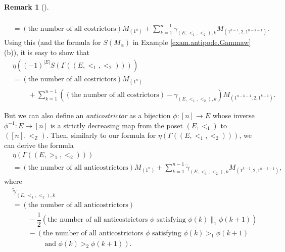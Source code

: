 \documentclass[numbers=enddot,12pt,final,onecolumn,notitlepage,abstracton]{scrartcl}
\theoremstyle{definition}
\newtheorem{remk}[theo]{Remark}
\newenvironment{remark}[1][]
{\begin{remk}[#1]\begin{leftbar}}
{\end{leftbar}\end{remk}}
\let\sumnonlimits\sum
\renewcommand{\sum}{\sumnonlimits\limits}
\newenvironment{verlong}{}{}
\begin{document}
\begin{remark}
\begin{verlong}
\begin{align*}
\\
& =\left(  \text{the number of all costrictors}\right)  M_{\left(
1^{n}\right)  }+\sum_{k=1}^{n-1}\gamma_{\left(  E,<_{1},<_{2}\right)
,k}M_{\left(  1^{k-1},2,1^{n-k-1}\right)  }.
\end{align*}
Using this (and the formula for $S\left(  M_{\alpha}\right)  $ in Example
\ref{exam.antipode.Gammaw} (b)), it is easy to show that
\begin{align*}
& \eta\left(  \left(  -1\right)  ^{\left\vert E\right\vert }S\left(
\Gamma\left(  \left(  E,<_{1},<_{2}\right)  \right)  \right)  \right)  \\
& =\left(  \text{the number of all costrictors}\right)  M_{\left(
1^{n}\right)  }\\
& \ \ \ \ \ \ \ \ \ \ +\sum_{k=1}^{n-1}\left(  \left(  \text{the number of all
costrictors}\right)  -\gamma_{\left(  E,<_{1},<_{2}\right)  ,k}\right)
M_{\left(  1^{n-k-1},2,1^{k-1}\right)  }.
\end{align*}


But we can also define an \textit{anticostrictor} as a bijection $\phi:\left[
n\right]  \rightarrow E$ whose inverse $\phi^{-1}:E\rightarrow\left[
n\right]  $ is a strictly decreasing map from the poset $\left(
E,<_{1}\right)  $ to $\left(  \left[  n\right]  ,<_{\mathbb{Z}}\right)  $.
Then, similarly to our formula for $\eta\left(  \Gamma\left(  \left(
E,<_{1},<_{2}\right)  \right)  \right)  $, we can derive the formula
\begin{align*}
& \eta\left(  \Gamma\left(  \left(  E,>_{1},<_{2}\right)  \right)  \right)
\\
& =\left(  \text{the number of all anticostrictors}\right)  M_{\left(
1^{n}\right)  }+\sum_{k=1}^{n-1}\widetilde{\gamma}_{\left(  E,<_{1}%
,<_{2}\right)  ,k}M_{\left(  1^{k-1},2,1^{n-k-1}\right)  },
\end{align*}
where
\begin{align*}
& \widetilde{\gamma}_{\left(  E,<_{1},<_{2}\right)  ,k}\\
& =\left(  \text{the number of all anticostrictors}\right)  \\
& \ \ \ \ \ \ \ \ \ \ -\dfrac{1}{2}\left(  \text{the number of all
anticostrictors }\phi\text{ satisfying }\phi\left(  k\right)  \parallel
_{1}\phi\left(  k+1\right)  \right)  \\
& \ \ \ \ \ \ \ \ \ \ -\left(  \text{the number of all anticostrictors }%
\phi\text{ satisfying }\phi\left(  k\right)  >_{1}\phi\left(  k+1\right)
\right. \\
& \ \ \ \ \ \ \ \ \ \ \qquad \left.
\text{ and }\phi\left(  k\right)  >_{2}\phi\left(  k+1\right)  \right)  .
\end{align*}



\end{verlong}
\end{remark}
\end{document}
